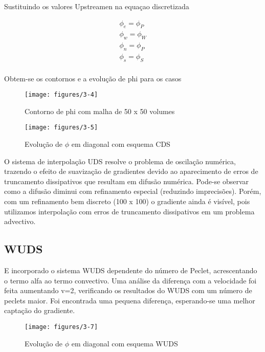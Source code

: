 \documentclass[]{article}
\begin{document}
Sustituindo os valores Upstreamen na equaçao discretizada


\begin{equation}
	\begin{aligned}
		\phi_e = \phi_P\\
		\phi_w = \phi_W\\
		\phi_n = \phi_P\\
		\phi_s = \phi_S
	\end{aligned}	
\end{equation}\\

Obtem-se os contornos e a evolução de phi para os casos\\

\begin{figure}[H]
	\centering
	\texttt{[image: figures/3-4]}
	\caption{Contorno de phi com malha de 50 x 50 volumes}
\end{figure}

\begin{figure}[H]
	\centering
	\texttt{[image: figures/3-5]}
	\caption{Evolução de $\phi$ em diagonal com esquema CDS}
\end{figure}

O sistema de interpolação UDS resolve o problema de oscilação numérica, trazendo o efeito de suavização de gradientes devido ao aparecimento de erros de truncamento dissipativos que resultam em difusão numérica. Pode-se observar como a difusão diminui com refinamento especial (reduzindo imprecisões). Porém, com um refinamento bem discreto (100 x 100) o gradiente ainda é visível, pois utilizamos interpolação com erros de truncamento dissipativos em um problema advectivo.

\subsection*{WUDS}

E incorporado o sistema WUDS dependente do número de Peclet, acrescentando o termo alfa ao termo convectivo. Uma análise da diferença com a velocidade foi feita aumentando v=2, verificando os resultados do WUDS com um número de peclets maior. Foi encontrada uma pequena diferença, esperando-se uma melhor captação do gradiente.

\begin{figure}[H]
	\centering
	\texttt{[image: figures/3-7]}
	\caption{Evolução de $\phi$ em diagonal com esquema WUDS}
\end{figure}
\end{document}
